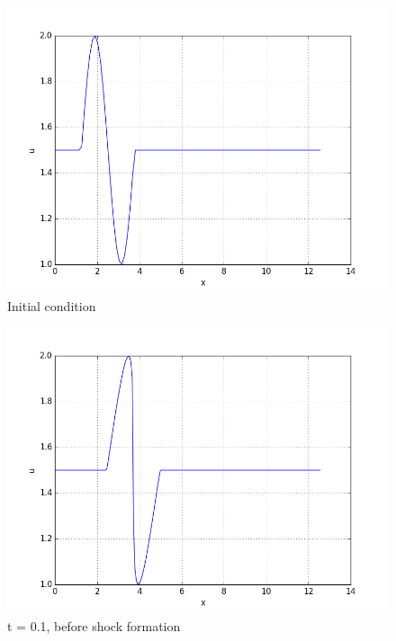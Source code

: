 \documentclass{article}
\begin{document}
\FloatBarrier
\begin{figure}[h!]
	\centering
	\includegraphics[scale=0.5]{hp-sol-n100-init}
	\caption{Initial condition}
\end{figure}
 

\begin{figure}[h!]
	\centering
	\includegraphics[scale=0.5]{hp-sol-t01}
	\caption{t = 0.1, before shock formation}
\end{figure}
 
\end{document}
